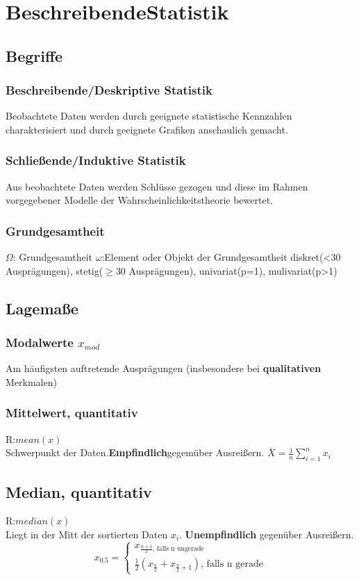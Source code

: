 \section{BeschreibendeStatistik}
  \subsection{Begriffe}
    \subsubsection{Beschreibende/Deskriptive Statistik}
    Beobachtete Daten werden durch geeignete statistische Kennzahlen charakterisiert und durch geeignete Grafiken anschaulich gemacht.
    \subsubsection{Schließende/Induktive Statistik}
    Aus beobachtete Daten werden Schlüsse gezogen und diese im Rahmen vorgegebener Modelle der Wahrscheinlichkeitstheorie bewertet.
    \subsubsection{Grundgesamtheit}
    $\Omega$: Grundgesamtheit
    $\omega$:Element oder Objekt der Grundgesamtheit
    diskret(<30 Ausprägungen), stetig($\geq$30 Ausprägungen), univariat(p=1), mulivariat(p>1)
  \subsection{Lagemaße}
    \subsubsection{Modalwerte $x_{mod}$}
    Am häufigsten auftretende Ausprägungen (insbesondere bei \textbf{qualitativen} Merkmalen)
    \subsubsection{Mittelwert, quantitativ}
    R:$mean(x)$\\
    Schwerpunkt der Daten.\textbf{Empfindlich}gegemüber Ausreißern.
    $\overline{X} = \frac{1}{n} \sum_{i=1}^{n} x_{i}$
    \subsection{Median, quantitativ}
    R:$median(x)$\\
    Liegt in der Mitt der sortierten Daten $x_{i}$. \textbf{Unempfindlich} gegenüber Ausreißern.
    \begin{equation}
      x_{0.5} =
        \begin{cases}
        	x_{\frac{n+1}{2} \text{, falls n ungerade}}\\
        	\frac{1}{2}(x_{\frac{n}{2}} + x_{\frac{n}{2}+1}) \text{, falls n gerade}
        \end{cases}
    \end{equation}

